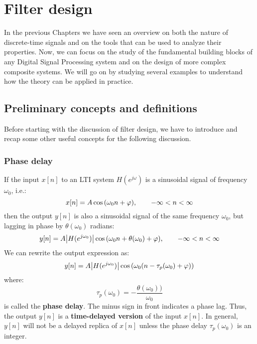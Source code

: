 \documentclass[../../main/main.tex]{subfiles}
\begin{document}
\chapter{Filter design}

In the previous Chapters we have seen an overview on both the nature of discrete-time signals and on the tools that can be used to analyze their properties. Now, we can focus on the study of the fundamental building blocks of any Digital Signal Processing system and on the design of more complex composite systems. We will go on by studying several examples to understand how the theory can be applied in practice.





\section{Preliminary concepts and definitions}
Before starting with the discussion of filter design, we have to introduce and recap some other useful concepts for the following discussion.



\subsection{Phase delay}
If the input \( x[n] \) to an LTI system \( H(e^{j\omega}) \) is a sinusoidal signal of frequency \( \omega_{0} \), i.e.:
\begin{equation}
    x[n]
    =
    A\cos\qty(\omega_{0}n + \varphi),
    \qquad
    - \infty < n < \infty
    \label{eq:L17_S18_1}
\end{equation}
then the output \( y[n] \) is also a sinusoidal signal of the same frequency \( \omega_{0} \), but lagging in phase by \( \theta(\omega_{0}) \) radians:
\begin{equation}
    y[n]
    =
    A \abs{H(e^{j\omega_{0}})} \cos\qty(\omega_{0}n + \theta(\omega_{0}) + \varphi),
    \qquad
    - \infty < n < \infty
    \label{eq:L17_S18_2}
\end{equation}
We can rewrite the output expression as:
\begin{equation}
    y[n]
    =
    A \abs{H(e^{j\omega_{0}})} \cos\qty(\omega_{0}(n-\tau_{p}(\omega_{0}) + \varphi))
    \label{eq:L17_S19_1}
\end{equation}
where:
\begin{equation}
    \tau_{p}(\omega_{0})
    =
    - \frac{\theta(\omega_{0}))}{\omega_{0}}
    \label{eq:L17_S19_2}
\end{equation}
is called the \textbf{phase delay}. The minus sign in front indicates a phase lag. Thus, the output \( y[n] \) is a \textbf{time-delayed version} of the input \( x[n] \). In general, \( y[n] \) will not be a delayed replica of \( x[n] \) unless the phase delay \( \tau_{p}(\omega_{0}) \) is an integer.
\end{document}
